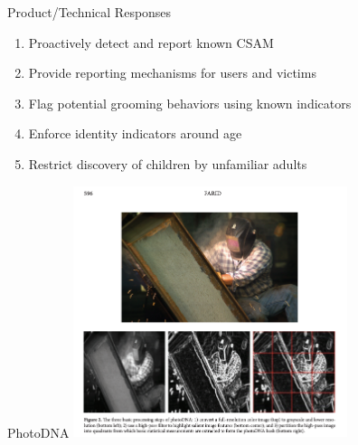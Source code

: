 \documentclass[nobackground,dvipsnames,table,aspectratio=169]{beamer}
\begin{document}
\begin{frame}{Product/Technical Responses}
    \large
    \begin{enumerate}
        \item Proactively detect and report known CSAM
        \item Provide reporting mechanisms for users and victims
        \item Flag potential grooming behaviors using known indicators
        \item Enforce identity indicators around age
        \item Restrict discovery of children by unfamiliar adults
    \end{enumerate}
\end{frame}

\begin{frame}{PhotoDNA}
    \centering
    \includegraphics[width=0.6\textwidth]{photodna}
\end{frame}
\end{document}
